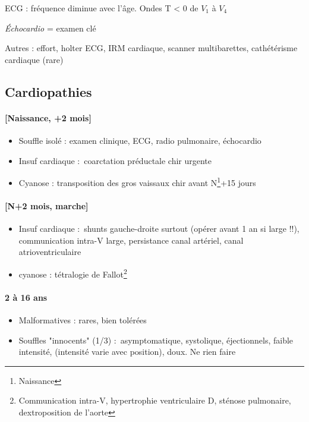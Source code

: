 ECG : fréquence diminue avec l'âge. Ondes T < 0 de $V_1$ à $V_4$

\textit{Échocardio} = examen clé

Autres : effort, holter ECG, IRM cardiaque, scanner multibarettes, cathétérisme
cardiaque (rare)

\subsection{Cardiopathies}
\paragraph{[Naissance, +2 mois]}
\begin{itemize}
  \item Souffle isolé : examen clinique, ECG, radio pulmonaire, échocardio
  \item Insuf cardiaque : coarctation préductale \thus chir urgente
  \item Cyanose : transposition des gros vaissaux \thus chir avant N\footnote{Naissance}+15 jours
\end{itemize}

\paragraph{[N+2 mois, marche]}
\begin{itemize}
  \item Insuf cardiaque : shunts gauche-droite surtout (\thus opérer avant 1 an
    si large !!), communication intra-V
    large, persistance canal artériel, canal atrioventriculaire
  \item cyanose : tétralogie de Fallot\footnote{Communication intra-V,
      hypertrophie ventriculaire D, sténose pulmonaire, dextroposition de
    l'aorte}
\end{itemize}
\paragraph{2 à 16 ans}
\begin{itemize}
  \item Malformatives : rares, bien tolérées
  \item Souffles "innocents" (1/3) : asymptomatique, systolique, éjectionnels,
    faible intensité, (intensité varie avec position), doux. Ne rien faire
\end{itemize}

